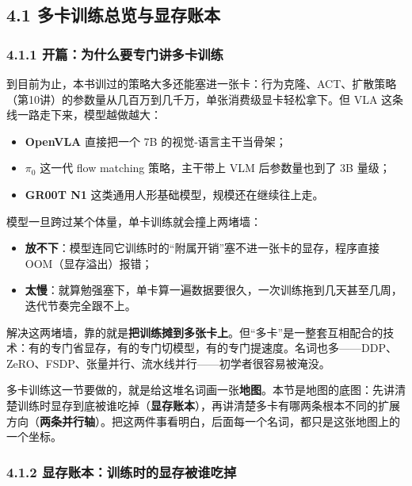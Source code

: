 \documentclass[
  chinese,
]{ctexart}
\providecommand{\tightlist}{%
  \setlength{\itemsep}{0pt}\setlength{\parskip}{0pt}}
\begin{document}
\subsection{4.1
多卡训练总览与显存账本}\label{ux591aux5361ux8badux7ec3ux603bux89c8ux4e0eux663eux5b58ux8d26ux672c}

\subsubsection{4.1.1
开篇：为什么要专门讲多卡训练}\label{ux5f00ux7bc7ux4e3aux4ec0ux4e48ux8981ux4e13ux95e8ux8bb2ux591aux5361ux8badux7ec3}

到目前为止，本书训过的策略大多还能塞进一张卡：行为克隆、ACT、扩散策略（第10讲）的参数量从几百万到几千万，单张消费级显卡轻松拿下。但
VLA 这条线一路走下来，模型越做越大：

\begin{itemize}
\tightlist
\item
  \textbf{OpenVLA} 直接把一个 7B 的视觉-语言主干当骨架；
\item
  \textbf{\(\pi_0\)} 这一代 flow matching 策略，主干带上 VLM
  后参数量也到了 3B 量级；
\item
  \textbf{GR00T N1} 这类通用人形基础模型，规模还在继续往上走。
\end{itemize}

模型一旦跨过某个体量，单卡训练就会撞上两堵墙：

\begin{itemize}
\tightlist
\item
  \textbf{放不下}：模型连同它训练时的``附属开销''塞不进一张卡的显存，程序直接
  OOM（显存溢出）报错；
\item
  \textbf{太慢}：就算勉强塞下，单卡算一遍数据要很久，一次训练拖到几天甚至几周，迭代节奏完全跟不上。
\end{itemize}

解决这两堵墙，靠的就是\textbf{把训练摊到多张卡上}。但``多卡''是一整套互相配合的技术：有的专门省显存，有的专门切模型，有的专门提速度。名词也多------DDP、ZeRO、FSDP、张量并行、流水线并行------初学者很容易被淹没。

多卡训练这一节要做的，就是给这堆名词画一张\textbf{地图}。本节是地图的底图：先讲清楚训练时显存到底被谁吃掉（\textbf{显存账本}），再讲清楚多卡有哪两条根本不同的扩展方向（\textbf{两条并行轴}）。把这两件事看明白，后面每一个名词，都只是这张地图上的一个坐标。

\subsubsection{4.1.2
显存账本：训练时的显存被谁吃掉}\label{ux663eux5b58ux8d26ux672cux8badux7ec3ux65f6ux7684ux663eux5b58ux88abux8c01ux5403ux6389}
\end{document}
